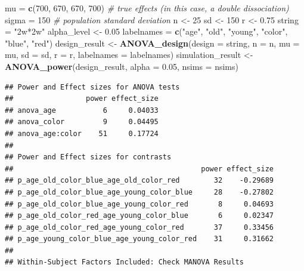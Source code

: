 \documentclass[]{book}
\newenvironment{Shaded}{\begin{snugshade}}{\end{snugshade}}
\newcommand{\CommentTok}[1]{\textcolor[rgb]{0.56,0.35,0.01}{\textit{#1}}}
\newcommand{\DataTypeTok}[1]{\textcolor[rgb]{0.13,0.29,0.53}{#1}}
\newcommand{\DecValTok}[1]{\textcolor[rgb]{0.00,0.00,0.81}{#1}}
\newcommand{\FloatTok}[1]{\textcolor[rgb]{0.00,0.00,0.81}{#1}}
\newcommand{\KeywordTok}[1]{\textcolor[rgb]{0.13,0.29,0.53}{\textbf{#1}}}
\newcommand{\NormalTok}[1]{#1}
\newcommand{\StringTok}[1]{\textcolor[rgb]{0.31,0.60,0.02}{#1}}
\begin{document}
\begin{Shaded}
\begin{Highlighting}[]
\NormalTok{mu =}\StringTok{ }\KeywordTok{c}\NormalTok{(}\DecValTok{700}\NormalTok{, }\DecValTok{670}\NormalTok{, }\DecValTok{670}\NormalTok{, }\DecValTok{700}\NormalTok{) }\CommentTok{# true effects (in this case, a double dissociation)}
\NormalTok{sigma =}\StringTok{ }\DecValTok{150}  \CommentTok{# population standard deviation}
\NormalTok{n <-}\StringTok{ }\DecValTok{25}
\NormalTok{sd <-}\StringTok{ }\DecValTok{150}
\NormalTok{r <-}\StringTok{ }\FloatTok{0.75}
\NormalTok{string =}\StringTok{ "2w*2w"}
\NormalTok{alpha_level <-}\StringTok{ }\FloatTok{0.05}
\NormalTok{labelnames =}\StringTok{ }\KeywordTok{c}\NormalTok{(}\StringTok{"age"}\NormalTok{, }\StringTok{"old"}\NormalTok{, }\StringTok{"young"}\NormalTok{, }\StringTok{"color"}\NormalTok{, }\StringTok{"blue"}\NormalTok{, }\StringTok{"red"}\NormalTok{)}
\NormalTok{design_result <-}\StringTok{ }\KeywordTok{ANOVA_design}\NormalTok{(}\DataTypeTok{design =}\NormalTok{ string,}
                              \DataTypeTok{n =}\NormalTok{ n, }
                              \DataTypeTok{mu =}\NormalTok{ mu, }
                              \DataTypeTok{sd =}\NormalTok{ sd, }
                              \DataTypeTok{r =}\NormalTok{ r, }
                              \DataTypeTok{labelnames =}\NormalTok{ labelnames)}
\NormalTok{simulation_result <-}\StringTok{ }\KeywordTok{ANOVA_power}\NormalTok{(design_result, }\DataTypeTok{alpha =} \FloatTok{0.05}\NormalTok{, }\DataTypeTok{nsims =}\NormalTok{ nsims)}
\end{Highlighting}
\end{Shaded}

\begin{verbatim}
## Power and Effect sizes for ANOVA tests
##                 power effect_size
## anova_age           6     0.04033
## anova_color         9     0.04495
## anova_age:color    51     0.17724
## 
## Power and Effect sizes for contrasts
##                                            power effect_size
## p_age_old_color_blue_age_old_color_red        32    -0.29689
## p_age_old_color_blue_age_young_color_blue     28    -0.27802
## p_age_old_color_blue_age_young_color_red       8     0.04693
## p_age_old_color_red_age_young_color_blue       6     0.02347
## p_age_old_color_red_age_young_color_red       37     0.33456
## p_age_young_color_blue_age_young_color_red    31     0.31662
## 
## Within-Subject Factors Included: Check MANOVA Results
\end{verbatim}
\end{document}

